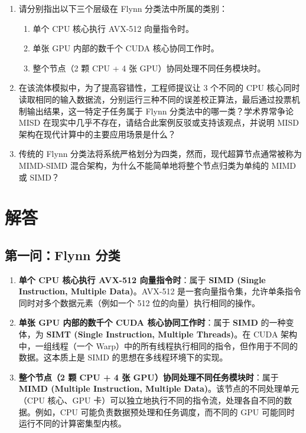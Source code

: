 \begin{enumerate}
    \item 请分别指出以下三个层级在 Flynn 分类法中所属的类别：
    \begin{enumerate}
        \item 单个 CPU 核心执行 AVX-512 向量指令时。
        \item 单张 GPU 内部的数千个 CUDA 核心协同工作时。
        \item 整个节点（2 颗 CPU + 4 张 GPU）协同处理不同任务模块时。
    \end{enumerate}
    \item 在该流体模拟中，为了提高容错性，工程师提议让 3 个不同的 CPU 核心同时读取相同的输入数据流，分别运行三种不同的误差校正算法，最后通过投票机制输出结果，这一特定子任务属于 Flynn 分类法中的哪一类？学术界常争论 MISD 在现实中几乎不存在，请结合此案例反驳或支持该观点，并说明 MISD 架构在现代计算中的主要应用场景是什么？
    \item 传统的 Flynn 分类法将系统严格划分为四类，然而，现代超算节点通常被称为 MIMD-SIMD 混合架构，为什么不能简单地将整个节点归类为单纯的 MIMD 或 SIMD？
\end{enumerate}

\section{解答}

\subsection{第一问：Flynn 分类}
\begin{enumerate}
    \item \textbf{单个 CPU 核心执行 AVX-512 向量指令时}：属于 \textbf{SIMD (Single Instruction, Multiple Data)}。AVX-512 是一套向量指令集，允许单条指令同时对多个数据元素（例如一个 512 位的向量）执行相同的操作。
    \item \textbf{单张 GPU 内部的数千个 CUDA 核心协同工作时}：属于 \textbf{SIMD} 的一种变体，为 \textbf{SIMT (Single Instruction, Multiple Threads)}。在 CUDA 架构中，一组线程（一个 Warp）中的所有线程执行相同的指令，但作用于不同的数据。这本质上是 SIMD 的思想在多线程环境下的实现。
    \item \textbf{整个节点（2 颗 CPU + 4 张 GPU）协同处理不同任务模块时}：属于 \textbf{MIMD (Multiple Instruction, Multiple Data)}。该节点的不同处理单元（CPU 核心、GPU 卡）可以独立地执行不同的指令流，处理各自不同的数据。例如，CPU 可能负责数据预处理和任务调度，而不同的 GPU 可能同时运行不同的计算密集型内核。
\end{enumerate}

